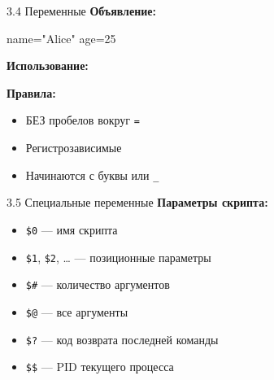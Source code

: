 \documentclass[
  ignorenonframetext,
  aspectratio=169,
  russian,
]{beamer}
\newenvironment{Shaded}{\begin{snugshade}}{\end{snugshade}}
\newcommand{\BuiltInTok}[1]{\textcolor[rgb]{0.00,0.23,0.31}{#1}}
\newcommand{\NormalTok}[1]{\textcolor[rgb]{0.00,0.23,0.31}{#1}}
\newcommand{\OperatorTok}[1]{\textcolor[rgb]{0.37,0.37,0.37}{#1}}
\newcommand{\StringTok}[1]{\textcolor[rgb]{0.13,0.47,0.30}{#1}}
\newcommand{\VariableTok}[1]{\textcolor[rgb]{0.07,0.07,0.07}{#1}}
\providecommand{\tightlist}{%
  \setlength{\itemsep}{0pt}\setlength{\parskip}{0pt}}
\begin{document}
\begin{frame}[fragile]{3.4 Переменные}
\label{ux43fux435ux440ux435ux43cux435ux43dux43dux44bux435}
\textbf{Объявление:}

\begin{Shaded}
\begin{Highlighting}[]
\VariableTok{name}\OperatorTok{=}\StringTok{"Alice"}
\VariableTok{age}\OperatorTok{=}\NormalTok{25}
\end{Highlighting}
\end{Shaded}

\textbf{Использование:}

\begin{Shaded}
\end{Shaded}

\textbf{Правила:}

\begin{itemize}[<+->]
\tightlist
\item
  БЕЗ пробелов вокруг \texttt{=}
\item
  Регистрозависимые
\item
  Начинаются с буквы или \texttt{\_}
\end{itemize}
\end{frame}

\begin{frame}[fragile]{3.5 Специальные переменные}
\label{ux441ux43fux435ux446ux438ux430ux43bux44cux43dux44bux435-ux43fux435ux440ux435ux43cux435ux43dux43dux44bux435}
\textbf{Параметры скрипта:}

\begin{itemize}[<+->]
\tightlist
\item
  \texttt{\$0} --- имя скрипта
\item
  \texttt{\$1}, \texttt{\$2}, \ldots{} --- позиционные параметры
\item
  \texttt{\$\#} --- количество аргументов
\item
  \texttt{\$@} --- все аргументы
\item
  \texttt{\$?} --- код возврата последней команды
\item
  \texttt{\$\$} --- PID текущего процесса
\end{itemize}
\end{frame}
\end{document}
